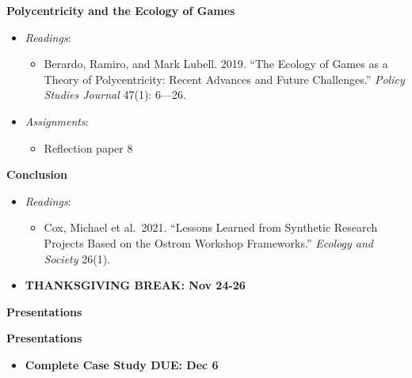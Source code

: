 \week \textbf{Polycentricity and the Ecology of Games}

\begin{itemize}

\item
  \emph{Readings}:

  \begin{itemize}
  
  \item
    Berardo, Ramiro, and Mark Lubell. 2019. ``The Ecology of Games as a
    Theory of Polycentricity: Recent Advances and Future Challenges.''
    \emph{Policy Studies Journal} 47(1): 6---26.
  \end{itemize}
\item
  \emph{Assignments}:

  \begin{itemize}
  
  \item
    Reflection paper 8
  \end{itemize}
\end{itemize}

\week \textbf{Conclusion}

\begin{itemize}

\item
  \emph{Readings}:

  \begin{itemize}
  
  \item
    Cox, Michael et al.~2021. ``Lessons Learned from Synthetic Research
    Projects Based on the Ostrom Workshop Frameworks.'' \emph{Ecology
    and Society} 26(1).
  \end{itemize}
\item
  \textbf{THANKSGIVING BREAK: Nov 24-26}
\end{itemize}

\week \textbf{Presentations}

\week \textbf{Presentations}

\begin{itemize}

\item
  \textbf{Complete Case Study DUE: Dec 6}
\end{itemize}
